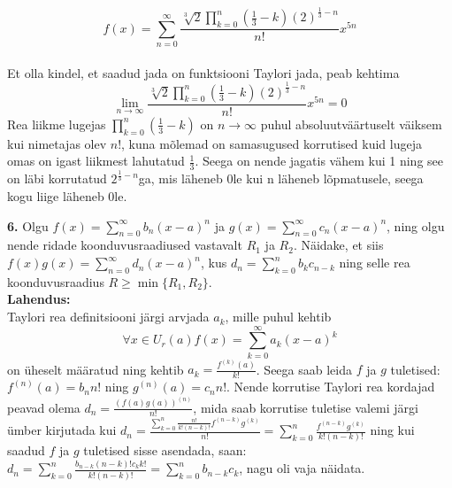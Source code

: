 \documentclass{article}
\begin{document}
\begin{enumerate}
\begin{equation*}
f(x)=\sum_{n=0}^\infty\frac{\sqrt[3]{2}\displaystyle\prod_{k=0}^n(\frac{1}{3}-k)(2)^{\frac{1}{3}-n}}{n!}x^{5n}
\end{equation*}
\pagebreak\\
Et olla kindel, et saadud jada on funktsiooni Taylori jada, peab kehtima
\begin{equation*}
\lim_{n\to\infty}\frac{\sqrt[3]{2}\displaystyle\prod_{k=0}^n(\frac{1}{3}-k)(2)^{\frac{1}{3}-n}}{n!}x^{5n}=0
\end{equation*}
Rea liikme lugejas $\prod_{k=0}^n(\frac{1}{3}-k)$ on $n\to\infty$ puhul absoluutv\"a\"artuselt v\"aiksem kui nimetajas olev $n!$, kuna m\~olemad on samasugused korrutised kuid lugeja omas on igast liikmest lahutatud $\frac{1}{3}$. Seega on nende jagatis v\"ahem kui 1 ning see on l\"abi korrutatud $2^{\frac{1}{3}-n}$ga, mis l\"aheneb 0le kui n l\"aheneb l\~opmatusele, seega kogu liige l\"aheneb 0le.
\end{enumerate}
\pagebreak
\textbf{6.} Olgu $f(x)=\sum_{n=0}^{\infty} b_n(x-a)^n$ ja $g(x)=\sum_{n=0}^{\infty} c_n(x-a)^n$, ning olgu nende ridade koonduvusraadiused vastavalt $R_1$ ja $R_2$. N\"aidake, et siis $f(x) g(x)=\sum_{n=0}^{\infty} d_n(x-a)^n$, kus $d_n=\sum_{k=0}^n b_k c_{n-k}$ ning selle rea koonduvusraadius $R \geq \min\{R_1,R_2\}$.\\
\textbf{Lahendus:}\\
Taylori rea definitsiooni j\"argi arvjada $a_k$, mille puhul kehtib 
\begin{equation*}
\forall x\in U_r(a) f(x)=\sum_{k=0}^\infty a_k(x-a)^k
\end{equation*}
on \"uheselt m\"a\"aratud ning kehtib $a_k=\frac{f^{(k)}(a)}{k!}$. Seega saab leida $f$ ja $g$ tuletised: $f^{(n)}(a)=b_nn!$ ning $g^{(n)}(a)=c_nn!$. Nende korrutise Taylori rea kordajad peavad olema $d_n=\frac{(f(a)g(a))^{(n)}}{n!}$, mida saab korrutise tuletise valemi j\"argi \"umber kirjutada kui $d_n=\frac{\displaystyle\sum_{k=0}^n  \frac{n!}{k!(n-k)!} f^{(n-k)} g^{(k)}}{n!}=\sum_{k=0}^n\frac{f^{(n-k)} g^{(k)}}{k!(n-k)!}$ ning kui saadud $f$ ja $g$ tuletised sisse asendada, saan: $d_n=\sum_{k=0}^n\frac{b_{n-k}(n-k)! c_kk!}{k!(n-k)!}=\sum_{k=0}^nb_{n-k}c_k$, nagu oli vaja n\"aidata.\\
\end{document}

